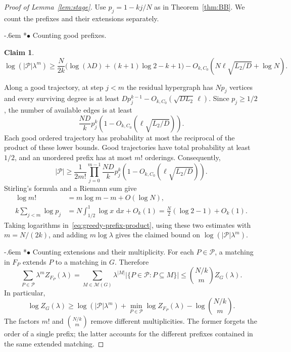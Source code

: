 \documentclass[11pt,reqno]{amsart}
\makeatletter
\numberwithin{equation}{section}
\renewcommand{\paragraph}{\@startsection{paragraph}{4}%
    \z@{.75\linespacing\@plus.2\linespacing\@minus.1\linespacing}%
    {-.6em}%
    {\normalfont\bfseries}}
\newcommand{\proofparagraph}[1]{%
    \paragraph*{$\bullet$ #1}\ignorespaces}
\theoremstyle{plain}
\newtheorem{claim}{Claim}[section]
\newenvironment{claimproof}[1][Proof]{\par
    \pushQED{\qed}%
    \renewcommand{\qedsymbol}{$\blacksquare$}
    \normalfont \topsep6\p@\@plus6\p@\relax
    \trivlist
    \item[\hskip\labelsep
    \textit{#1}\@addpunct{.}~]\ignorespaces
}{%
    \popQED\endtrivlist\@endpefalse
}
\theoremstyle{definition}
\newcommand{\dd}{\,\mathrm d}
\makeatother
\begin{document}
\begin{proof}[Proof of Lemma~\ref{lem:stage}]
    Use $p_j=1-kj/N$ as in Theorem~\ref{thm:BB}.
    We count the prefixes and their extensions separately.

    \proofparagraph{Counting good prefixes.}
    \begin{claim}\label{clm:greedy-prefixes}
    \[
        \log(|\mathcal P|\lambda^m) \ge\frac N{2k}\bigl(\log(\lambda D)+(k+1)\log2-k+1\bigr) -O_{k,C_0}(N\ell\sqrt{L_2/D}+\log N).
    \]

    \end{claim}
    \begin{claimproof}[Proof of Claim~\ref{clm:greedy-prefixes}]
    Along a good trajectory, at step $j<m$ the residual hypergraph has $Np_j$ vertices and every surviving degree is at least $Dp_j^{k-1}-O_{k,C_0}(\sqrt{DL_2}\,\ell)$.
    Since $p_j\ge1/2$, the number of available edges is at least
    \[
        \frac{ND}{k}p_j^k(1-O_{k,C_0}(\ell\sqrt{L_2/D})).
    \]
    Each good ordered trajectory has probability at most the reciprocal of the product of these lower bounds.
    Good trajectories have total probability at least $1/2$, and an unordered prefix has at most $m!$ orderings.
    Consequently,
    \begin{equation}\label{eq:greedy-prefix-product}
        |\mathcal P|\ge\frac1{2m!} \prod_{j=0}^{m-1}\frac{ND}{k}p_j^k(1-O_{k,C_0}(\ell\sqrt{L_2/D})).
    \end{equation}
    Stirling's formula and a Riemann sum give
    \begin{align*}
        \log m! & =m\log m-m+O(\log N),\\
        k\sum_{j<m}\log p_j & =N\int_{1/2}^1\log x\,\dd x+O_k(1) =\frac N2(\log2-1)+O_k(1).
    \end{align*}
    Taking logarithms in~\eqref{eq:greedy-prefix-product}, using these two estimates with $m=N/(2k)$, and adding $m\log\lambda$ gives the claimed bound on $\log(|\mathcal P|\lambda^m)$.
    \end{claimproof}

    \proofparagraph{Counting extensions and their multiplicity.}
    For each $P\in\mathcal P$, a matching in $F_P$ extends $P$ to a matching in $G$.
    Therefore
    \[
        \sum_{P\in\mathcal P}\lambda^mZ_{F_P}(\lambda) =\sum_{M\in\mathcal M(G)}\lambda^{|M|} |\{P\in\mathcal P:P\subseteq M\}| \le\binom{N/k}{m}Z_G(\lambda).
    \]
    In particular,
    \begin{equation}\label{eq:greedy-extension-count}
        \log Z_G(\lambda)\ge \log(|\mathcal P|\lambda^m)+\min_{P\in\mathcal P}\log Z_{F_P}(\lambda) -\log\binom{N/k}{m}.
    \end{equation}
    The factors $m!$ and $\binom{N/k}{m}$ remove different multiplicities.
    The former forgets the order of a single prefix; the latter accounts for the different prefixes contained in the same extended matching.


\end{proof}
\end{document}
